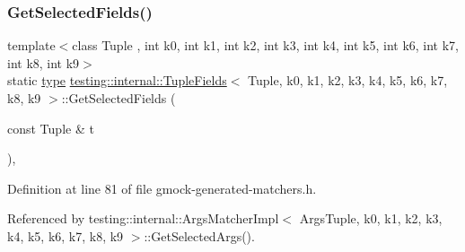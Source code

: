 \subsubsection{\texorpdfstring{Get\+Selected\+Fields()}{GetSelectedFields()}}
{\footnotesize\ttfamily template$<$class Tuple , int k0, int k1, int k2, int k3, int k4, int k5, int k6, int k7, int k8, int k9$>$ \\
static \hyperlink{classtesting_1_1internal_1_1TupleFields_a5480877377ebc94bf3a6c6cab5c369bc}{type} \hyperlink{classtesting_1_1internal_1_1TupleFields}{testing\+::internal\+::\+Tuple\+Fields}$<$ Tuple, k0, k1, k2, k3, k4, k5, k6, k7, k8, k9 $>$\+::Get\+Selected\+Fields (\begin{DoxyParamCaption}\item[{const Tuple \&}]{t }\end{DoxyParamCaption})\hspace{0.3cm}{\ttfamily [inline]}, {\ttfamily [static]}}



Definition at line 81 of file gmock-\/generated-\/matchers.\+h.



Referenced by testing\+::internal\+::\+Args\+Matcher\+Impl$<$ Args\+Tuple, k0, k1, k2, k3, k4, k5, k6, k7, k8, k9 $>$\+::\+Get\+Selected\+Args().


